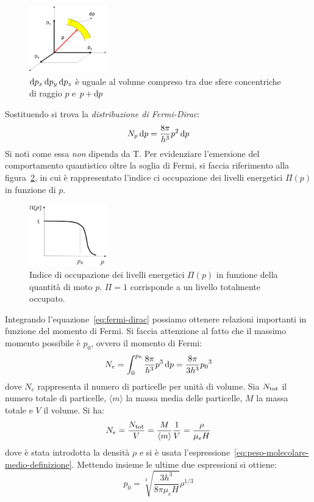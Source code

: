 \begin{figure}
\centering
\includegraphics[width=0.3\textwidth]{immagini/volume-infinitesimo-sfera.png}
\caption{$\mathop{\mathrm{{}d}}\mathopen{} p_x \mathop{\mathrm{{}d}}\mathopen{} p_y \mathop{\mathrm{{}d}}\mathopen{} p_z$ è uguale al volume compreso tra due sfere concentriche di raggio $p$ e $p + \mathop{\mathrm{{}d}}\mathopen{} p$}
\label{fig:volume-infinitesimo-sfera}
\end{figure}

Sostituendo si trova la \emph{distribuzione di Fermi-Dirac}:
\begin{equation}\label{eq:fermi-dirac}
    N_p \mathop{\mathrm{{}d}}\mathopen{} p = \frac{8 \pi}{h^3} p^2 \mathop{\mathrm{{}d}}\mathopen{} p
\end{equation}
Si noti come essa \emph{non} dipenda da T. Per evidenziare l'emersione del comportamento quantistico oltre la soglia di Fermi, si faccia riferimento alla figura~\ref{fig:distribuzione-fermi}, in cui è rappresentato l'indice ci occupazione dei livelli energetici $\Pi(p)$ in funzione di $p$.

\begin{figure}
\centering
\includegraphics[width=0.3\textwidth]{immagini/distribuzione-fermi.png}
\caption{Indice di occupazione dei livelli energetici $\Pi(p)$ in funzione della quantità di moto $p$. $\Pi = 1$ corrisponde a un livello totalmente occupato.}
\label{fig:distribuzione-fermi}
\end{figure}

Integrando l'equazione~\eqref{eq:fermi-dirac} possiamo ottenere relazioni importanti in funzione del momento di Fermi. Si faccia attenzione al fatto che il massimo momento possibile è $p_0$, ovvero il momento di Fermi:
\[
N_e = \int_0^{p_0} \frac{8 \pi}{h^3} p^3 \mathop{\mathrm{{}d}}\mathopen{} p = \frac{8\pi}{3h^3} {p_0}^3
\]
dove $N_e$ rappresenta il numero di particelle per unità di volume. Sia $N_\textup{tot}$ il numero totale di particelle, $\langle m \rangle$ la massa media delle particelle, $M$ la massa totale e $V$ il volume. Si ha:
\[
N_e = \frac{N_\textup{tot}}{V} = \frac{M}{\langle m \rangle} \frac{1}{V} = \frac{\rho}{\mu_e H}
\]
dove è stata introdotta la densità $\rho$ e si è usata l'espressione~\eqref{eq:peso-molecolare-medio-definizione}.
Mettendo insieme le ultime due espressioni si ottiene:
\begin{equation}\label{eq:relazione-momento-fermi-densità}
    p_0 = \sqrt[3]{\dfrac{3h^3}{8\pi \mu_e H}} \rho^{1/3}
\end{equation}

